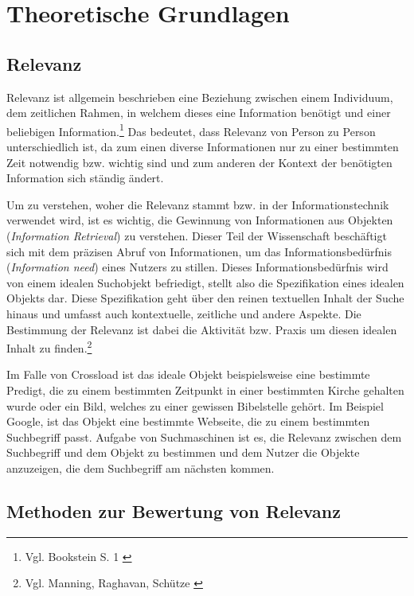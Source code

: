 \chapter{Theoretische Grundlagen}
\label{ch:grundlagen}

\section{Relevanz}

Relevanz ist allgemein beschrieben eine Beziehung zwischen einem Individuum, dem zeitlichen Rahmen, in welchem dieses eine Information benötigt und einer beliebigen Information.\footnote{Vgl. Bookstein S. 1 \cite{bookstein2007}}
Das bedeutet, dass Relevanz von Person zu Person unterschiedlich ist, da zum einen diverse Informationen nur zu einer bestimmten Zeit notwendig bzw. wichtig sind und zum anderen der Kontext der benötigten Information sich ständig ändert.

Um zu verstehen, woher die Relevanz stammt bzw. in der Informationstechnik verwendet wird, ist es wichtig, die Gewinnung von Informationen aus Objekten (\emph{Information Retrieval}) zu verstehen.
Dieser Teil der Wissenschaft beschäftigt sich mit dem präzisen Abruf von Informationen, um das Informationsbedürfnis (\emph{Information need}) eines Nutzers zu stillen.
Dieses Informationsbedürfnis wird von einem idealen Suchobjekt befriedigt, stellt also die Spezifikation eines idealen Objekts dar.
Diese Spezifikation geht über den reinen textuellen Inhalt der Suche hinaus und umfasst auch kontextuelle, zeitliche und andere Aspekte.
Die Bestimmung der Relevanz ist dabei die Aktivität bzw. Praxis um diesen idealen Inhalt zu finden.\footnote{Vgl. Manning, Raghavan, Schütze \cite{manning2008}}

Im Falle von Crossload ist das ideale Objekt beispielsweise eine bestimmte Predigt, die zu einem bestimmten Zeitpunkt in einer bestimmten Kirche gehalten wurde oder ein Bild, welches zu einer gewissen Bibelstelle gehört.
Im Beispiel Google, ist das Objekt eine bestimmte Webseite, die zu einem bestimmten Suchbegriff passt.
Aufgabe von Suchmaschinen ist es, die Relevanz zwischen dem Suchbegriff und dem Objekt zu bestimmen und dem Nutzer die Objekte anzuzeigen, die dem Suchbegriff am nächsten kommen.

\section{Methoden zur Bewertung von Relevanz}

